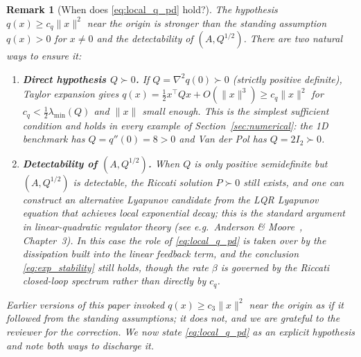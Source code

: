 \documentclass[11pt]{article}
\newtheorem{remark}[theorem]{Remark}
\begin{document}
\begin{remark}[When does \eqref{eq:local_q_pd} hold?]
\label{rem:local_pd}
The hypothesis $q(x)\geq c_q\|x\|^2$ near the origin is \emph{stronger} than the standing assumption $q(x)>0$ for $x\neq 0$ and the detectability of $(A,Q^{1/2})$. There are two natural ways to ensure it:
\begin{enumerate}
\item \textbf{Direct hypothesis $Q \succ 0$.} If $Q = \nabla^2 q(0) \succ 0$ (strictly positive definite), Taylor expansion gives $q(x) = \tfrac12 x^\top Q x + O(\|x\|^3) \geq c_q\|x\|^2$ for $c_q < \tfrac12\lambda_{\min}(Q)$ and $\|x\|$ small enough. This is the simplest sufficient condition and holds in every example of Section~\ref{sec:numerical}: the 1D benchmark has $Q = q''(0) = 8 > 0$ and Van der Pol has $Q = 2I_2 \succ 0$.
\item \textbf{Detectability of $(A, Q^{1/2})$.} When $Q$ is only positive semidefinite but $(A, Q^{1/2})$ is detectable, the Riccati solution $P\succ 0$ still exists, and one can construct an alternative Lyapunov candidate from the LQR Lyapunov equation that achieves local exponential decay; this is the standard argument in linear-quadratic regulator theory (see e.g.\ Anderson \& Moore~\cite{anderson_moore}, Chapter~3). In this case the role of \eqref{eq:local_q_pd} is taken over by the dissipation built into the linear feedback term, and the conclusion \eqref{eq:exp_stability} still holds, though the rate $\beta$ is governed by the Riccati closed-loop spectrum rather than directly by $c_q$.
\end{enumerate}
Earlier versions of this paper invoked $q(x)\geq c_3\|x\|^2$ near the origin as if it followed from the standing assumptions; it does not, and we are grateful to the reviewer for the correction. We now state \eqref{eq:local_q_pd} as an explicit hypothesis and note both ways to discharge it.
\end{remark}
\end{document}
